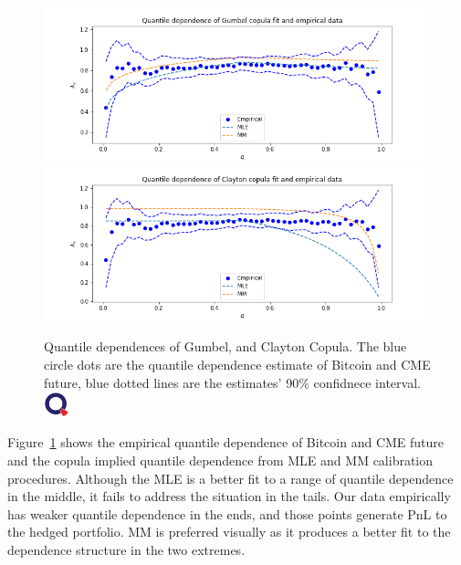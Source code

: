 \begin{figure}[h]
\includegraphics[width=\textwidth]{_pics/Gumbel Copula quantile dependence.png}
\includegraphics[width=\textwidth]{_pics/Clayton Copula quantile dependence.png}
  \caption{Quantile dependences of Gumbel, and Clayton Copula. The blue circle dots are
  the quantile dependence estimate of Bitcoin and CME future, blue dotted lines are the estimates' 90\% confidnece interval.
  \href{http://www.quantlet.com/}{\includegraphics[width=20pt]{_pics/qletlogo_tr.png}} }
\label{fig:quantile dependence1}
\end{figure}

Figure~\ref{fig:quantile dependence1} shows the empirical quantile dependence of Bitcoin and CME future and the copula implied
quantile dependence from MLE and MM calibration procedures.
Although the MLE is a better fit to a range of quantile dependence in the middle, it fails to address the situation in the tails.
Our data empirically has weaker quantile dependence in the ends, and those points generate PnL to the hedged portfolio.
MM is preferred visually as it produces a better fit to the dependence structure in the two extremes.


